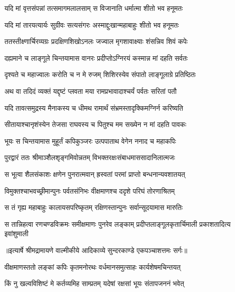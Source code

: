\twolineshloka
{यदि मां वृत्तसंपन्नां तत्समागमलालसाम्}
{स विजानाति धर्मात्मा शीतो भव हनूमतः} %

\twolineshloka
{यदि मां तारयत्यार्यः सुग्रीवः सत्यसंगरः}
{अस्माद्दुःखान्महाबाहुः शीतो भव हनूमतः} %

\twolineshloka
{ततस्तीक्ष्णार्चिरव्यग्रः प्रदक्षिणशिखोऽनलः}
{जज्वाल मृगशावाक्ष्याः शंसन्निव शिवं कपेः} %

\twolineshloka
{दह्यमाने च लाङ्गूले चिन्तयामास वानरः}
{प्रदीप्तोऽग्निरयं कस्मान्न मां दहति सर्वतः} %

\twolineshloka
{दृश्यते च महाज्वालः करोति च न मे रुजम्}
{शिशिरस्येव संपातो लाङ्गूलाग्रे प्रतिष्ठितः} %

\twolineshloka
{अथ वा तदिदं व्यक्तं यद्दृष्टं प्लवता मया}
{रामप्रभावादाश्चर्यं पर्वतः सरितां पतौ} %

\twolineshloka
{यदि तावत्समुद्रस्य मैनाकस्य च धीमथ}
{रामार्थं संभ्रमस्तादृक्किमग्निर्न करिष्यति} %

\twolineshloka
{सीतायाश्चानृशंस्येन तेजसा राघवस्य च}
{पितुश्च मम सख्येन न मां दहति पावकः} %

\twolineshloka
{भूयः स चिन्तयामास मुहूर्तं कपिकुञ्जरः}
{उत्पपाताथ वेगेन ननाद च महाकपिः} %

\twolineshloka
{पुरद्वारं ततः श्रीमाञ्शैलशृङ्गमिवोन्नतम्}
{विभक्तरक्षःसंबाधमाससादानिलात्मजः} %

\twolineshloka
{स भूत्वा शैलसंकाशः क्षणेन पुनरात्मवान्}
{ह्रस्वतां परमां प्राप्तो बन्धनान्यवशातयत्} %

\twolineshloka
{विमुक्तश्चाभवच्छ्रीमान्पुनः पर्वतसंनिभः}
{वीक्षमाणश्च ददृशे परिघं तोरणाश्रितम्} %

\twolineshloka
{स तं गृह्य महाबाहुः कालायसपरिष्कृतम्}
{रक्षिणस्तान्पुनः सर्वान्सूदयामास मारुतिः} %

\fourlineindentedshloka
{स तान्निहत्वा रणचण्डविक्रमः}
{ समीक्षमाणः पुनरेव लङ्काम्}
{प्रदीप्तलाङ्गूलकृतार्चिमाली}
{ प्रकाशतादित्य इवांशुमाली} %


{॥इत्यार्षे श्रीमद्रामायणे वाल्मीकीये आदिकाव्ये सुन्दरकाण्डे एकपञ्चाशत्तमः सर्गः॥}


\twolineshloka
{वीक्षमाणस्ततो लङ्कां कपिः कृतमनोरथः}
{वर्धमानसमुत्साहः कार्यशेषमचिन्तयत्} %

\twolineshloka
{किं नु खल्वविशिष्टं मे कर्तव्यमिह साम्प्रतम्}
{यदेषां रक्षसां भूयः संतापजननं भवेत्} %

